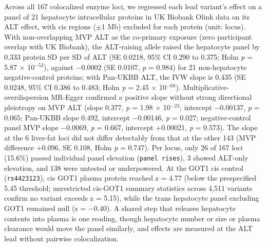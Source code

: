 Across all 167 colocalized enzyme loci, we regressed each lead variant's effect on a panel of 21 hepatocyte intracellular proteins in UK Biobank Olink data on its ALT effect, with cis regions ($\pm$1 Mb) excluded for each protein (unit: locus). With non-overlapping MVP ALT as the co-primary exposure (zero participant overlap with UK Biobank), the ALT-raising allele raised the hepatocyte panel by 0.333 protein SD per SD of ALT (SE 0.0218, 95\% CI 0.290 to 0.375; Holm \emph{p} = 5.87 $\times$ 10$^{-52}$), against $-$0.0002 (SE 0.0107, \emph{p} = 0.984) for 21 non-hepatocyte negative-control proteins; with Pan-UKBB ALT, the IVW slope is 0.435 (SE 0.0248, 95\% CI 0.386 to 0.483; Holm \emph{p} = 2.45 $\times$ 10$^{-68}$). Multiplicative-overdispersion MR-Egger confirmed a positive slope without strong directional pleiotropy on MVP ALT (slope 0.377, \emph{p} = 1.98 $\times$ 10$^{-23}$; intercept $-$0.00137, \emph{p} = 0.065; Pan-UKBB slope 0.492, intercept $-$0.00146, \emph{p} = 0.027; negative-control panel MVP slope $-$0.0069, \emph{p} = 0.667, intercept +0.00021, \emph{p} = 0.573). The slope at the 6 liver-fat loci did not differ detectably from that at the other 143 (MVP difference +0.096, SE 0.108, Holm \emph{p} = 0.747). Per locus, only 26 of 167 loci (15.6\%) passed individual panel elevation (\texttt{panel rises}), 3 showed ALT-only elevation, and 138 were untested or underpowered. At the GOT1 cis control (\texttt{rs4423123}), cis GOT1 plasma protein reached z = 4.77 (below the prespecified 5.45 threshold; unrestricted cis-GOT1 summary statistics across 4,511 variants confirm no variant exceeds \textbar z\textbar{} = 5.15), while the trans hepatocyte panel excluding GOT1 remained null (z = $-$0.40). A shared step that releases hepatocyte contents into plasma is one reading, though hepatocyte number or size or plasma clearance would move the panel similarly, and effects are measured at the ALT lead without pairwise colocalization.

